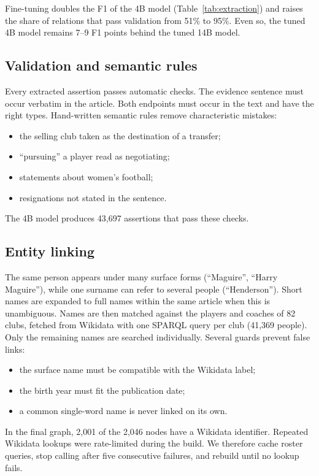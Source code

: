 \documentclass[11pt]{article}
\begin{document}
Fine-tuning doubles the F1 of the 4B model (Table~\ref{tab:extraction}) and raises the share of relations that pass validation from 51\% to 95\%. Even so, the tuned 4B model remains 7--9 F1 points behind the tuned 14B model.

\subsection{Validation and semantic rules}\label{sec:validation}
Every extracted assertion passes automatic checks. The evidence sentence must occur verbatim in the article. Both endpoints must occur in the text and have the right types. Hand-written semantic rules remove characteristic mistakes:
\begin{itemize}
\item the selling club taken as the destination of a transfer;
\item ``pursuing'' a player read as negotiating;
\item statements about women's football;
\item resignations not stated in the sentence.
\end{itemize}
The 4B model produces 43,697 assertions that pass these checks.

\subsection{Entity linking}
The same person appears under many surface forms (``Maguire'', ``Harry Maguire''), while one surname can refer to several people (``Henderson''). Short names are expanded to full names within the same article when this is unambiguous. Names are then matched against the players and coaches of 82 clubs, fetched from Wikidata with one SPARQL query per club (41,369 people). Only the remaining names are searched individually. Several guards prevent false links:
\begin{itemize}
\item the surface name must be compatible with the Wikidata label;
\item the birth year must fit the publication date;
\item a common single-word name is never linked on its own.
\end{itemize}
In the final graph, 2,001 of the 2,046 nodes have a Wikidata identifier. Repeated Wikidata lookups were rate-limited during the build. We therefore cache roster queries, stop calling after five consecutive failures, and rebuild until no lookup fails.
\end{document}
